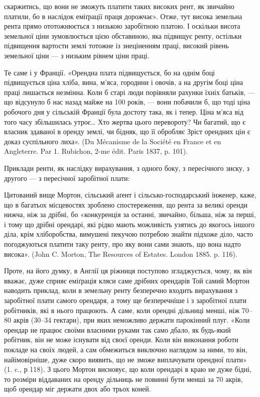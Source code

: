 \parcont{}  %
скаржитись, що вони не зможуть платити таких високих рент, як звичайно
платили, бо в наслідок еміґрації праця дорожчає». Отже, тут висока земельна
рента прямо ототожнюється з низькою заробітною платою. І оскільки висота
земельної ціни зумовлюється цією обставиною, яка підвищує ренту, остільки підвищення
вартости землі тотожне із знеціненням праці, високий рівень земельної
ціни — з низьким рівнем ціни праці.

Те саме і у Франції. «Орендна плата підвищується, бо на однім боці підвищується
ціна хліба, вина, м’яса, городини і овочів, а на другім боці ціна
праці лишається незмінна. Коли б старі люди порівняли рахунки їхніх батьків, —
що відсунуло б нас назад майже на 100 років, — вони побачили б, що тоді ціна
робочого дня у сільській Франції була достоту така, як і тепер. Ціна м’яса від того
часу збільшилась утроє\dots{} Хто жертва цього перевороту? Чи багатий, що є власник
здаваної в оренду землі, чи бідняк, що її обробляє Зріст орендних
цін є доказ суспільного лиха». (Du Mécanisme de la Société en France et en
Angleterre. Par 1. Rubichon, 2-me édit. Paris 1837, p. 101).

Приклади ренти, як наслідку вирахування, з одного боку, з пересічного
зиску, з другого — з пересічної заробітної плати:

Цитований вище Мортон, сільський аґент і сільсько-господарський інженер,
каже, що в багатьох місцевостях зроблено спостереження, що рента
за великі оренди нижча, ніж за дрібні, бо «конкуренція за останні, звичайно,
більша, ніж за перші, і тому що дрібні орендарі, які рідко мають можливість
узятись до якогось іншого діла, крім хліборобства, вимушені пекучою потребою
знайти підхоже діло, часто погоджуються платити таку ренту, про яку вони
сами знають, що вона надто висока». (John C. Morton, The Resources of Estates.
London 1885. p. 116).

Проте, на його думку, в Англії ця ріжниця поступово згладжується, чому,
як він вважає, дуже сприяє еміґрація кляси саме дрібних орендарів Той самий
Мортон наводить приклад, коли в земельну ренту безперечно входить вирахування
з заробітної плати самого орендаря, а тому ще безперечніше і з заробітної
плати робітників, які в нього працюють. А саме, коли орендні дільниці
менші, ніж 70--80 акрів (30--34 гектари), при яких неможливо держати парокінний
плуг. «Коли орендар не працює своїми власними руками так само
дбало, як будь-який робітник, він не може існувати від своєї оренди. Коли він
виконання роботи покладе на своїх людей, а сам обмежиться виключно наглядом
за ними, то він, найімовірніше, дуже скоро виявить, що не зможе виплачувати
орендної плати» (1. c., р 118). З цього Мортон висновує, що коли орендарі
в краю не дуже бідні, то розміри віддаваних на оренду дільниць не повинні
бути менші за 70 акрів, щоб орендар міг держати двох або трьох коней.

